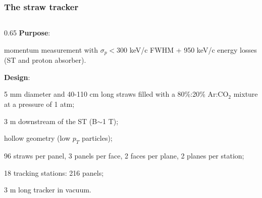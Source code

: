 \documentclass{beamer}
\begin{document}
\begin{frame}
    \frametitle{The straw tracker}
    \begin{columns}
    \begin{column}{0.65 \framewidth}
{\footnotesize \textbf{Purpose}:}
\vspace{0.5mm}
\begin{itemize}
    {\footnotesize \item momentum measurement with $\sigma_p<300$ keV/c FWHM + 950 keV/c energy losses (ST and proton absorber). }
    \vspace{2mm}
\end{itemize}
{\footnotesize \textbf{Design}:}
\vspace{1mm}
\begin{itemize}
    {\footnotesize
    \item 5 mm diameter and 40-110 cm long straws filled with a 80\%:20\% Ar:CO$_2$ mixture at a pressure of 1 atm;
    \vspace{2mm}
    \item 3 m downstream of the ST (B$\sim$1 T);
    \vspace{2mm}
    \item hollow geometry (low $p_T $ particles);
    \vspace{2mm}
    \item 96 straws per panel, 3 panels per face, 2 faces per plane, 2 planes per station;
    \vspace{2mm}
        \item 18 tracking stations: 216 panels;
        \vspace{2mm}
        \item 3 m long tracker in vacuum.}
       
        
        
    \end{itemize}
    

\end{column}
\end{columns}
\end{frame}
\end{document}
